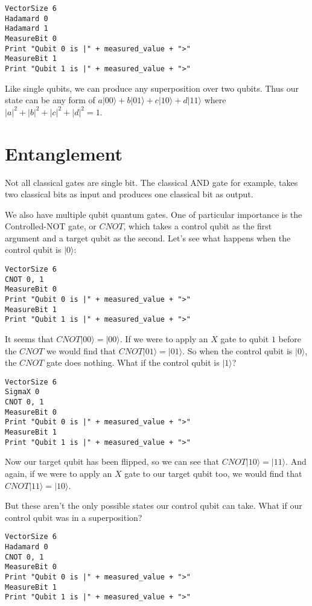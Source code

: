\documentclass[twocolumn]{article}
\begin{document}
\begin{lstlisting}
VectorSize 6
Hadamard 0
Hadamard 1
MeasureBit 0
Print "Qubit 0 is |" + measured_value + ">"
MeasureBit 1
Print "Qubit 1 is |" + measured_value + ">"
\end{lstlisting}

Like single qubits, we can produce any superposition over two qubits. Thus our state can be any form of $a|00\rangle + b|01\rangle + c|10\rangle + d|11\rangle$ where $|a|^2 + |b|^2 + |c|^2 + |d|^2 = 1$.

\section{Entanglement}

Not all classical gates are single bit. The classical AND gate for example, takes two classical bits as input and produces one classical bit as output.

We also have multiple qubit quantum gates. One of particular importance is the Controlled-NOT gate, or $CNOT$, which takes a control qubit as the first argument and a target qubit as the second. Let's see what happens when the control qubit is $|0\rangle$:

\begin{lstlisting}
VectorSize 6
CNOT 0, 1
MeasureBit 0
Print "Qubit 0 is |" + measured_value + ">"
MeasureBit 1
Print "Qubit 1 is |" + measured_value + ">"
\end{lstlisting}

It seems that $CNOT|00\rangle = |00\rangle$. If we were to apply an $X$ gate to qubit $1$ before the $CNOT$ we would find that $CNOT|01\rangle = |01\rangle$. So when the control qubit is $|0\rangle$, the $CNOT$ gate does nothing. What if the control qubit is $|1\rangle$?

\begin{lstlisting}
VectorSize 6
SigmaX 0
CNOT 0, 1
MeasureBit 0
Print "Qubit 0 is |" + measured_value + ">"
MeasureBit 1
Print "Qubit 1 is |" + measured_value + ">"
\end{lstlisting}

Now our target qubit has been flipped, so we can see that $CNOT|10\rangle = |11\rangle$. And again, if we were to apply an $X$ gate to our target qubit too, we would find that $CNOT|11\rangle = |10\rangle$.

But these aren't the only possible states our control qubit can take. What if our control qubit was in a superposition?

\begin{lstlisting}
VectorSize 6
Hadamard 0
CNOT 0, 1
MeasureBit 0
Print "Qubit 0 is |" + measured_value + ">"
MeasureBit 1
Print "Qubit 1 is |" + measured_value + ">"
\end{lstlisting}
\end{document}
